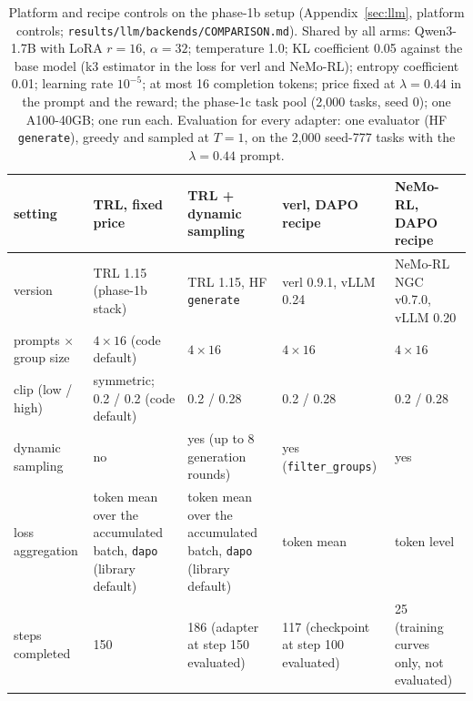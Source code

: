 \documentclass[10pt]{article}
\newcommand{\code}[1]{\texttt{#1}}
\begin{document}
\begin{table}[H]
\centering\footnotesize
\caption{Platform and recipe controls on the phase-1b setup (Appendix~\ref{sec:llm}, platform controls; \code{results/\allowbreak llm/\allowbreak backends/\allowbreak COMPARISON.md}). Shared by all arms: Qwen3-1.7B with LoRA $r=16$, $\alpha=32$; temperature 1.0; KL coefficient 0.05 against the base model (k3 estimator in the loss for verl and NeMo-RL); entropy coefficient 0.01; learning rate $10^{-5}$; at most 16 completion tokens; price fixed at $\lambda=0.44$ in the prompt and the reward; the phase-1c task pool (2{,}000 tasks, seed 0); one A100-40GB; one run each. Evaluation for every adapter: one evaluator (HF \code{generate}), greedy and sampled at $T=1$, on the 2{,}000 seed-777 tasks with the $\lambda=0.44$ prompt.}
\label{tab:det-backends}
\begin{tabular}{p{2.7cm}p{3.0cm}p{3.0cm}p{3.0cm}p{3.0cm}}
\toprule
setting & TRL, fixed price & TRL + dynamic sampling & verl, DAPO recipe & NeMo-RL, DAPO recipe \\
\midrule
version & TRL 1.15 (phase-1b stack) & TRL 1.15, HF \code{generate} & verl 0.9.1, vLLM 0.24 & NeMo-RL NGC v0.7.0, vLLM 0.20 \\
prompts $\times$ group size & $4\times16$ (code default) & $4\times16$ & $4\times16$ & $4\times16$ \\
clip (low / high) & symmetric; 0.2 / 0.2 (code default) & 0.2 / 0.28 & 0.2 / 0.28 & 0.2 / 0.28 \\
dynamic sampling & no & yes (up to 8 generation rounds) & yes (\code{filter\_groups}) & yes \\
loss aggregation & token mean over the accumulated batch, \code{dapo} (library default) & token mean over the accumulated batch, \code{dapo} (library default) & token mean & token level \\
steps completed & 150 & 186 (adapter at step 150 evaluated) & 117 (checkpoint at step 100 evaluated) & 25 (training curves only, not evaluated) \\
\bottomrule
\end{tabular}
\end{table}
\end{document}
